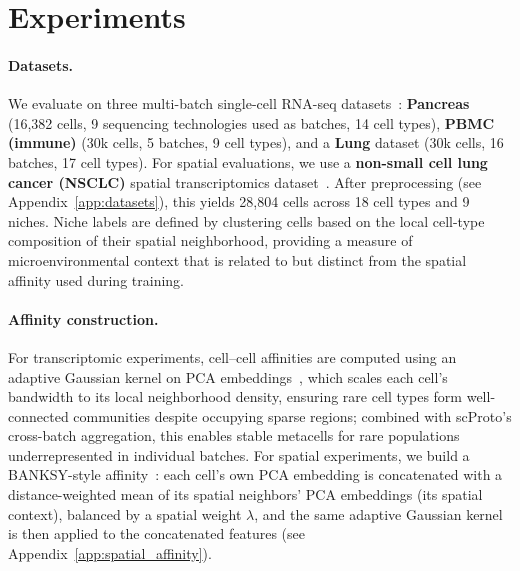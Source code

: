 \section{Experiments}
\label{sec:experiments}

\paragraph{Datasets.}
We evaluate on three multi-batch single-cell RNA-seq datasets~\citep{luecken2022benchmarking}:
\textbf{Pancreas} (16,382 cells, 9 sequencing technologies used as batches, 14 cell types),
\textbf{PBMC (immune)} (30k cells, 5 batches, 9 cell types),
and a \textbf{Lung} dataset (30k cells, 16 batches, 17 cell types).
For spatial evaluations, we use a \textbf{non-small cell lung cancer (NSCLC)} spatial transcriptomics dataset~\citep{pentimalli2025combining}.
After preprocessing (see Appendix~\ref{app:datasets}), this yields 28,804 cells across 18 cell types and 9 niches.
Niche labels are defined by clustering cells based on the local cell-type composition of their spatial neighborhood, providing a measure of microenvironmental context that is related to but distinct from the spatial affinity used during training.

\paragraph{Affinity construction.}
For transcriptomic experiments, cell--cell affinities are computed using an adaptive Gaussian kernel on PCA embeddings~\citep{seacells}, which scales each cell's bandwidth to its local neighborhood density, ensuring rare cell types form well-connected communities despite occupying sparse regions; combined with scProto's cross-batch aggregation, this enables stable metacells for rare populations underrepresented in individual batches.
For spatial experiments, we build a BANKSY-style affinity~\citep{banksy}: each cell's own PCA embedding is concatenated with a distance-weighted mean of its spatial neighbors' PCA embeddings (its spatial context), balanced by a spatial weight $\lambda$, and the same adaptive Gaussian kernel is then applied to the concatenated features (see Appendix~\ref{app:spatial_affinity}).

